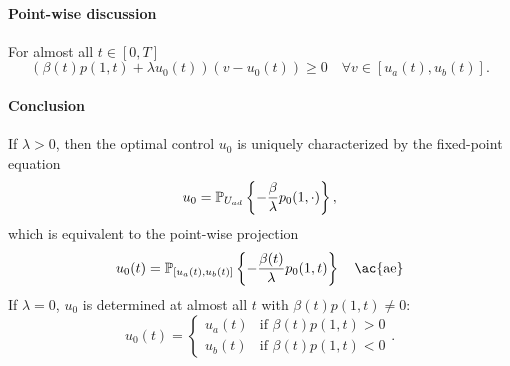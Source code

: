 \documentclass[../skript.tex]{subfiles}
\begin{document}
\paragraph{Point-wise discussion}
For almost all $t \in [0, T]$
\[
	\left(\beta(t) p(1, t) + \lambda u_0(t) \right)\left(v - u_0(t) \right) \geq 0 \quad \forall v \in [u_a(t), u_b(t)].
\]
\paragraph{Conclusion}
If $\lambda > 0$, then the optimal control $u_0$ is uniquely characterized by the fixed-point equation
\[
	u_0 = \mathbb{P}_{U_{ad}} \left\{ - \frac{\beta}{\lambda} p_0(1, \cdot) \right\},
\]
which is equivalent to the point-wise projection
\[
	u_0(t) = \PP_{[u_a(t), u_b(t)]} \left\{ - \frac{\beta(t)}{\lambda} p_0(1, t) \right\} \quad \text{\ac{ae}}
\]
If $\lambda = 0$, $u_0$ is determined at almost all $t$ with $\beta(t) p(1, t) \neq 0$:
\[
	u_0(t) = \begin{cases}
	u_a(t) & \text{if } \beta(t)p(1, t) > 0 \\
	u_b(t) & \text{if } \beta(t)p(1, t) < 0
	\end{cases}.
\]
\end{document}
